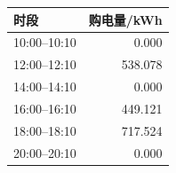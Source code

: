 \begin{tabular}{lr}
\toprule
时段 & 购电量/kWh \\
\midrule
10:00--10:10 & 0.000 \\
12:00--12:10 & 538.078 \\
14:00--14:10 & 0.000 \\
16:00--16:10 & 449.121 \\
18:00--18:10 & 717.524 \\
20:00--20:10 & 0.000 \\
\bottomrule
\end{tabular}
